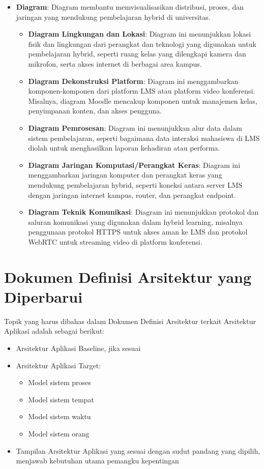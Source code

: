 \begin{itemize}
	\item \textbf{Diagram}: Diagram membantu memvisualisasikan distribusi, proses, dan jaringan yang mendukung pembelajaran hybrid di universitas.
	\begin{itemize}
		\item \textbf{Diagram Lingkungan dan Lokasi}: Diagram ini menunjukkan lokasi fisik dan lingkungan dari perangkat dan teknologi yang digunakan untuk pembelajaran hybrid, seperti ruang kelas yang dilengkapi kamera dan mikrofon, serta akses internet di berbagai area kampus.
		\item \textbf{Diagram Dekonstruksi Platform}: Diagram ini menggambarkan komponen-komponen dari platform LMS atau platform video konferensi. Misalnya, diagram Moodle mencakup komponen untuk manajemen kelas, penyimpanan konten, dan akses pengguna.
		\item \textbf{Diagram Pemrosesan}: Diagram ini menunjukkan alur data dalam sistem pembelajaran, seperti bagaimana data interaksi mahasiswa di LMS diolah untuk menghasilkan laporan kehadiran atau performa.
		\item \textbf{Diagram Jaringan Komputasi/Perangkat Keras}: Diagram ini menggambarkan jaringan komputer dan perangkat keras yang mendukung pembelajaran hybrid, seperti koneksi antara server LMS dengan jaringan internet kampus, router, dan perangkat endpoint.
		\item \textbf{Diagram Teknik Komunikasi}: Diagram ini menunjukkan protokol dan saluran komunikasi yang digunakan dalam hybrid learning, misalnya penggunaan protokol HTTPS untuk akses aman ke LMS dan protokol WebRTC untuk streaming video di platform konferensi.
	\end{itemize}
\end{itemize}


\section{Dokumen Definisi Arsitektur yang Diperbarui}
Topik yang harus dibahas dalam Dokumen Definisi Arsitektur terkait Arsitektur Aplikasi adalah sebagai berikut:
\begin{itemize}
	\item Arsitektur Aplikasi Baseline, jika sesuai
	\item Arsitektur Aplikasi Target:
	\begin{itemize}
		\item Model sistem proses
		\item Model sistem tempat
		\item Model sistem waktu
		\item Model sistem orang
	\end{itemize}
	\item Tampilan Arsitektur Aplikasi yang sesuai dengan sudut pandang yang dipilih, menjawab kebutuhan utama pemangku kepentingan
\end{itemize}

